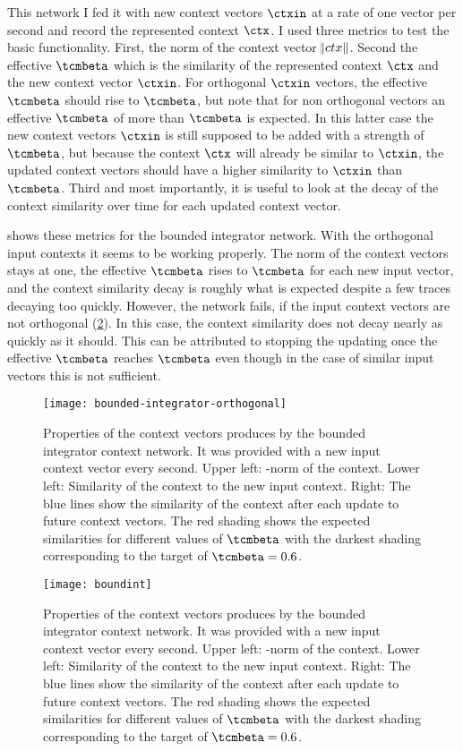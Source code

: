 This network I fed it with new context vectors $\ctxin$ at a rate of one vector per second and record the represented context $\ctx$.
I used three metrics to test the basic functionality. First, the norm of the context vector $\norm{ctx}$.
Second the effective $\tcmbeta$ which is the similarity of the represented context $\ctx$ and the new context vector $\ctxin$.
For orthogonal $\ctxin$ vectors, the effective $\tcmbeta$ should rise to $\tcmbeta$, but note that for non orthogonal vectors an effective $\tcmbeta$ of more than $\tcmbeta$ is expected.
In this latter case the new context vectors $\ctxin$ is still supposed to be added with a strength of $\tcmbeta$, but because the context $\ctx$ will already be similar to $\ctxin$, the updated context vectors should have a higher similarity to $\ctxin$ than $\tcmbeta$.
Third and most importantly, it is useful to look at the decay of the context similarity over time for each updated context vector.

 shows these metrics for the bounded integrator network. With the orthogonal input contexts it seems to be working properly.
The norm of the context vectors stays at one, the effective $\tcmbeta$ rises to $\tcmbeta$ for each new input vector, and the context similarity decay is roughly what is expected despite a few traces decaying too quickly.
However, the network fails, if the input context vectors are not orthogonal (\cref{fig:boundint}).
In this case, the context similarity does not decay nearly as quickly as it should.
This can be attributed to stopping the updating once the effective $\tcmbeta$ reaches $\tcmbeta$ even though in the case of similar input vectors this is not sufficient.
\begin{figure}
    \centering
    \texttt{[image: bounded-integrator-orthogonal]}
    \caption{
        Properties of the context vectors produces by the bounded integrator context network.
        It was provided with a new input context vector every second.
        Upper left: \ltwo-norm of the context.
        Lower left: Similarity of the context to the new input context.
        Right: The blue lines show the similarity of the context after each update to future context vectors.
        The red shading shows the expected similarities for different values of $\tcmbeta$ with the darkest shading corresponding to the target of $\tcmbeta = 0.6$.}\label{fig:bounded-integrator-orthogonal}
\end{figure}
\begin{figure}
    \centering
    \texttt{[image: boundint]}
    \caption{
        Properties of the context vectors produces by the bounded integrator context network.
        It was provided with a new input context vector every second.
        Upper left: \ltwo-norm of the context.
        Lower left: Similarity of the context to the new input context.
        Right: The blue lines show the similarity of the context after each update to future context vectors.
        The red shading shows the expected similarities for different values of $\tcmbeta$ with the darkest shading corresponding to the target of $\tcmbeta = 0.6$.}\label{fig:boundint}
\end{figure}

